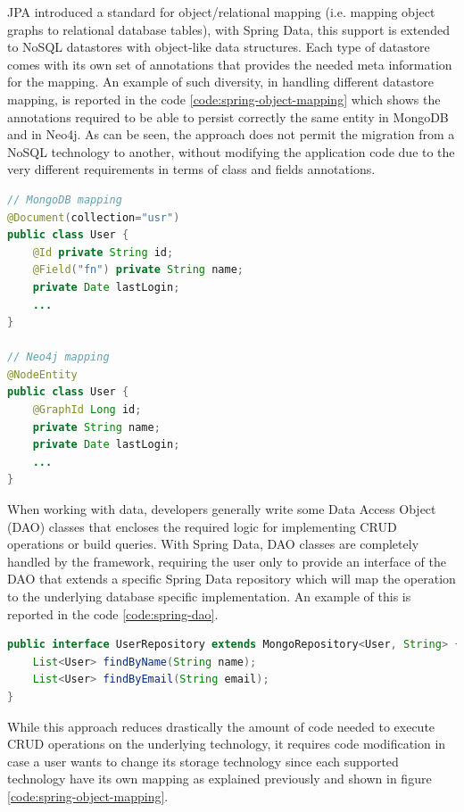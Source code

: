 \noindent JPA introduced a standard for object/relational mapping (i.e. mapping object graphs to relational database tables), with Spring Data, this support is extended to NoSQL datastores with object-like data structures.
Each type of datastore comes with its own set of annotations that provides the needed meta information for the mapping. An example of such diversity, in handling different datastore mapping, is reported in the code \ref{code:spring-object-mapping} which shows the annotations required to be able to persist correctly the same entity in MongoDB and in Neo4j. As can be seen, the approach does not permit the migration from a NoSQL technology to another, without modifying the application code due to the very different requirements in terms of class and fields annotations.

\begin{lstlisting}[language=Java, caption=Spring Data object mapping, label=code:spring-object-mapping]
// MongoDB mapping
@Document(collection="usr")
public class User {
    @Id private String id;
    @Field("fn") private String name;
    private Date lastLogin;
    ...
}

// Neo4j mapping
@NodeEntity
public class User {
    @GraphId Long id;
    private String name;
    private Date lastLogin;
    ...
}
\end{lstlisting}

\noindent When working with data, developers generally write some Data Access Object (DAO) classes that encloses the required logic for implementing CRUD operations or build queries.
With Spring Data, DAO classes are completely handled by the framework, requiring the user only to provide an interface of the DAO that extends a specific Spring Data repository which will map the operation to the underlying database specific implementation.
An example of this is reported in the code \ref{code:spring-dao}.

\begin{lstlisting}[language=Java, caption=Spring Data repositories, label=code:spring-dao]
public interface UserRepository extends MongoRepository<User, String> {
    List<User> findByName(String name);
    List<User> findByEmail(String email);
}
\end{lstlisting}

\noindent While this approach reduces drastically the amount of code needed to execute CRUD operations on the underlying technology, it requires code modification in case a user wants to change its storage technology since each supported technology have its own mapping as explained previously and shown in figure \ref{code:spring-object-mapping}.

